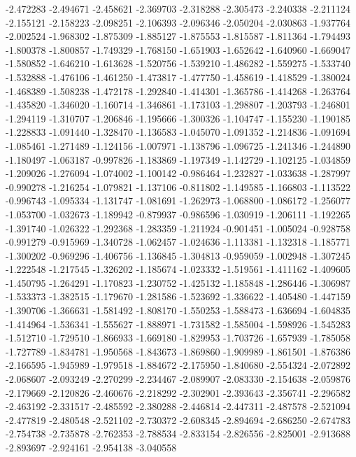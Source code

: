 -2.472283
-2.494671
-2.458621
-2.369703
-2.318288
-2.305473
-2.240338
-2.211124
-2.155121
-2.158223
-2.098251
-2.106393
-2.096346
-2.050204
-2.030863
-1.937764
-2.002524
-1.968302
-1.875309
-1.885127
-1.875553
-1.815587
-1.811364
-1.794493
-1.800378
-1.800857
-1.749329
-1.768150
-1.651903
-1.652642
-1.640960
-1.669047
-1.580852
-1.646210
-1.613628
-1.520756
-1.539210
-1.486282
-1.559275
-1.533740
-1.532888
-1.476106
-1.461250
-1.473817
-1.477750
-1.458619
-1.418529
-1.380024
-1.468389
-1.508238
-1.472178
-1.292840
-1.414301
-1.365786
-1.414268
-1.263764
-1.435820
-1.346020
-1.160714
-1.346861
-1.173103
-1.298807
-1.203793
-1.246801
-1.294119
-1.310707
-1.206846
-1.195666
-1.300326
-1.104747
-1.155230
-1.190185
-1.228833
-1.091440
-1.328470
-1.136583
-1.045070
-1.091352
-1.214836
-1.091694
-1.085461
-1.271489
-1.124156
-1.007971
-1.138796
-1.096725
-1.241346
-1.244890
-1.180497
-1.063187
-0.997826
-1.183869
-1.197349
-1.142729
-1.102125
-1.034859
-1.209026
-1.276094
-1.074002
-1.100142
-0.986464
-1.232827
-1.033638
-1.287997
-0.990278
-1.216254
-1.079821
-1.137106
-0.811802
-1.149585
-1.166803
-1.113522
-0.996743
-1.095334
-1.131747
-1.081691
-1.262973
-1.068800
-1.086172
-1.256077
-1.053700
-1.032673
-1.189942
-0.879937
-0.986596
-1.030919
-1.206111
-1.192265
-1.391740
-1.026322
-1.292368
-1.283359
-1.211924
-0.901451
-1.005024
-0.928758
-0.991279
-0.915969
-1.340728
-1.062457
-1.024636
-1.113381
-1.132318
-1.185771
-1.300202
-0.969296
-1.406756
-1.136845
-1.304813
-0.959059
-1.002948
-1.307245
-1.222548
-1.217545
-1.326202
-1.185674
-1.023332
-1.519561
-1.411162
-1.409605
-1.450795
-1.264291
-1.170823
-1.230752
-1.425132
-1.185848
-1.286446
-1.306987
-1.533373
-1.382515
-1.179670
-1.281586
-1.523692
-1.336622
-1.405480
-1.447159
-1.390706
-1.366631
-1.581492
-1.808170
-1.550253
-1.588473
-1.636694
-1.604835
-1.414964
-1.536341
-1.555627
-1.888971
-1.731582
-1.585004
-1.598926
-1.545283
-1.512710
-1.729510
-1.866933
-1.669180
-1.829953
-1.703726
-1.657939
-1.785058
-1.727789
-1.834781
-1.950568
-1.843673
-1.869860
-1.909989
-1.861501
-1.876386
-2.166595
-1.945989
-1.979518
-1.884672
-2.175950
-1.840680
-2.554324
-2.072892
-2.068607
-2.093249
-2.270299
-2.234467
-2.089907
-2.083330
-2.154638
-2.059876
-2.179669
-2.120826
-2.460676
-2.218292
-2.302901
-2.393643
-2.356741
-2.296582
-2.463192
-2.331517
-2.485592
-2.380288
-2.446814
-2.447311
-2.487578
-2.521094
-2.477819
-2.480548
-2.521102
-2.730372
-2.608345
-2.894694
-2.686250
-2.674783
-2.754738
-2.735878
-2.762353
-2.788534
-2.833154
-2.826556
-2.825001
-2.913688
-2.893697
-2.924161
-2.954138
-3.040558
